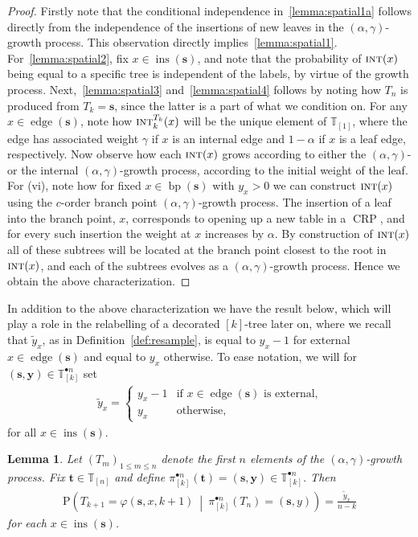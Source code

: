 \documentclass[a4paper, final]{amsart}
\theoremstyle{plain}
\newtheorem{lemma}[thm]{Lemma}
\theoremstyle{definition}
\newcommand{\tree}[1][t]{\boldsymbol{#1}}
\newcommand{\T}{\mathbb{T}}
\DeclareMathOperator{\edge}{edge}
\DeclareMathOperator{\insertable}{ins}
\DeclareMathOperator{\branchpoints}{bp}
\DeclareMathOperator{\intstruct}{\textsc{int}}
\newcommand{\insertablef}[1][\tree]{\insertable({\tree[#1]})}
\DeclareMathOperator{\crp}{CRP}
\renewcommand{\P}{\mathrm{P}}
\begin{document}
\begin{proof}
  Firstly note that the conditional independence in~\ref{lemma:spatial1a} follows directly from the independence of the insertions of new leaves in the $(\alpha, \gamma)$-growth process.
  This observation directly implies~\ref{lemma:spatial1}.
  For~\ref{lemma:spatial2}, fix $x \in \insertablef[s]$, and note that the probability of $\intstruct (x)$ being equal to a specific tree is independent of the labels, by virtue of the growth process.
  Next,~\ref{lemma:spatial3} and~\ref{lemma:spatial4} follows by noting how $T_n$ is produced from $T_k = \tree[s]$, since the latter is a part of what we condition on.
  For any $x \in \edge(\tree[s])$, note how $\intstruct_k^{T_k} (x)$ will be the unique element of $\T_{[1]}$, where the edge has associated weight $\gamma$ if $x$ is an internal edge and $1-\alpha$ if $x$ is a leaf edge, respectively.
  Now observe how each $\intstruct (x)$ grows according to either the $(\alpha, \gamma)$- or the internal $(\alpha, \gamma)$-growth process, according to the initial weight of the leaf. 
  For (vi), note how for fixed $x \in \branchpoints(\tree[s])$ with $y_x > 0$ we can construct $\intstruct (x)$ using the $c$-order branch point $(\alpha, \gamma)$-growth process.
  The insertion of a leaf into the branch point, $x$, corresponds to opening up a new table in a $\crp$, and for every such insertion the weight at $x$ increases by $\alpha$.
  By construction of $\intstruct (x)$ all of these subtrees will be located at the branch point closest to the root in $\intstruct (x)$, and each of the subtrees evolves as a $(\alpha, \gamma)$-growth process.
  Hence we obtain the above characterization.
\end{proof}
%
In addition to the above characterization we have the result below, which will play a role in the relabelling of a decorated $[k]$-tree later on, where we recall that $\tilde{y}_x$, as in Definition~\ref{def:resample}, is equal to $y_x - 1$ for external $x \in \edge(\tree[s])$ and equal to $y_x$ otherwise.
To ease notation, we will for $(\tree[s], \mathbf{y}) \in \T_{[k]}^{\bullet n}$ set
%
\begin{align*}
  \tilde{y}_x =
  \begin{cases}
    y_x - 1 & \text{if $x \in \edge(\tree[s])$ is external,} \\
    y_x & \text{otherwise,}
  \end{cases}
\end{align*}
%
for all $x \in \insertablef[s]$.
%
\begin{lemma}
  Let ${\left( T_m \right)}_{1 \leq m \leq n}$ denote the first $n$ elements of the $(\alpha, \gamma)$-growth process.
  Fix $\tree \in \T_{[n]}$ and define $\pi_{[k]}^{\bullet n} ( \tree ) = (\tree[s], \mathbf{y}) \in \T_{[k]}^{\bullet n}$.
  Then
  \begin{align*}
    \P \left( T_{k+1} = \varphi (\tree[s], x, k+1) \ \middle \vert \ \pi_{[k]}^{\bullet n} \left( T_n \right) = (\tree[s], y) \right)
    = \frac{\tilde{y}_x}{n-k}
  \end{align*}
  for each $x \in \insertablef[s]$.
  \label{lemma:locationof_k_plus1}
\end{lemma}
\end{document}
